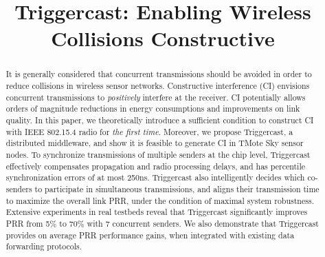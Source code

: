 \documentclass[conference]{IEEEtran}
\begin{document}
\title{Triggercast: Enabling Wireless Collisions Constructive}

\author{
}

\maketitle

\begin{abstract}
It is generally considered that concurrent transmissions should be avoided in order to reduce collisions in wireless sensor networks.
Constructive interference (CI) envisions concurrent transmissions to \emph{positively} interfere at the receiver.
CI potentially allows orders of magnitude reductions in energy consumptions and improvements on link quality.
In this paper, we theoretically introduce a sufficient condition to construct CI with IEEE 802.15.4 radio for \emph{the first time}.
Moreover, we propose Triggercast, a distributed middleware, and show it is feasible to generate CI in TMote Sky sensor nodes.
To synchronize transmissions of multiple senders at the chip level, Triggercast effectively compensates propagation and radio processing delays, and has  percentile synchronization errors of at most 250ns.
Triggercast also intelligently decides which co-senders to participate in simultaneous
transmissions, and aligns their transmission time to maximize the overall link PRR, under the condition of maximal system robustness.
Extensive experiments in real testbeds reveal that Triggercast significantly improves PRR from 5\% to 70\% with 7 concurrent senders.
We also demonstrate that Triggercast provides on average  PRR performance gains, when integrated with existing data forwarding protocols.
\end{abstract}
\end{document}
